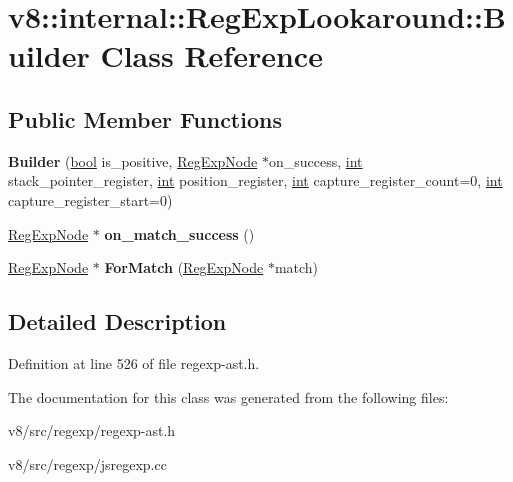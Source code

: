 \hypertarget{classv8_1_1internal_1_1RegExpLookaround_1_1Builder}{}\section{v8\+:\+:internal\+:\+:Reg\+Exp\+Lookaround\+:\+:Builder Class Reference}
\label{classv8_1_1internal_1_1RegExpLookaround_1_1Builder}
\subsection*{Public Member Functions}
\begin{DoxyCompactItemize}
\item 
\mbox{\label{classv8_1_1internal_1_1RegExpLookaround_1_1Builder_af156f4154e654d4f3f1d53008a2a429e}} 
{\bfseries Builder} (\mbox{\hyperlink{classbool}{bool}} is\+\_\+positive, \mbox{\hyperlink{classv8_1_1internal_1_1RegExpNode}{Reg\+Exp\+Node}} $\ast$on\+\_\+success, \mbox{\hyperlink{classint}{int}} stack\+\_\+pointer\+\_\+register, \mbox{\hyperlink{classint}{int}} position\+\_\+register, \mbox{\hyperlink{classint}{int}} capture\+\_\+register\+\_\+count=0, \mbox{\hyperlink{classint}{int}} capture\+\_\+register\+\_\+start=0)
\item 
\mbox{\label{classv8_1_1internal_1_1RegExpLookaround_1_1Builder_ae67317814d092e2f63b225745cc84b2a}} 
\mbox{\hyperlink{classv8_1_1internal_1_1RegExpNode}{Reg\+Exp\+Node}} $\ast$ {\bfseries on\+\_\+match\+\_\+success} ()
\item 
\mbox{\label{classv8_1_1internal_1_1RegExpLookaround_1_1Builder_aa532a5c308b557b9e7e0f68ee8dd679a}} 
\mbox{\hyperlink{classv8_1_1internal_1_1RegExpNode}{Reg\+Exp\+Node}} $\ast$ {\bfseries For\+Match} (\mbox{\hyperlink{classv8_1_1internal_1_1RegExpNode}{Reg\+Exp\+Node}} $\ast$match)
\end{DoxyCompactItemize}


\subsection{Detailed Description}


Definition at line 526 of file regexp-\/ast.\+h.



The documentation for this class was generated from the following files\+:\begin{DoxyCompactItemize}
\item 
v8/src/regexp/regexp-\/ast.\+h\item 
v8/src/regexp/jsregexp.\+cc\end{DoxyCompactItemize}

